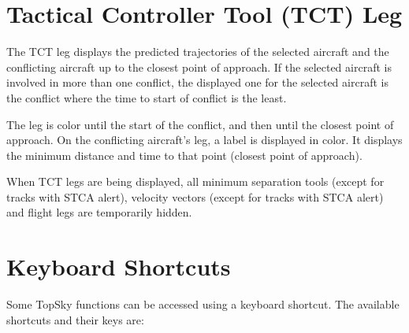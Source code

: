 \documentclass[a4paper,oneside,11pt]{memoir}
\begin{document}
\section{Tactical Controller Tool (TCT) Leg}\label{func:tct}

The TCT leg displays the predicted trajectories of the selected aircraft and the conflicting aircraft up to the closest point of approach. If the selected aircraft is involved in more than one conflict, the displayed one for the selected aircraft is the conflict where the time to start of conflict is the least.

\bigskip

The leg is  color until the start of the conflict, and then  until the closest point of approach. On the conflicting aircraft’s leg, a label is displayed in  color. It displays the minimum distance and time to that point (closest point of approach).

\bigskip

When TCT legs are being displayed, all minimum separation tools (except for tracks with STCA alert), velocity vectors (except for tracks with STCA alert) and flight legs are temporarily hidden.

\section{Keyboard Shortcuts}\label{func:short}

Some TopSky functions can be accessed using a keyboard shortcut. The available shortcuts and their keys are:
\end{document}
